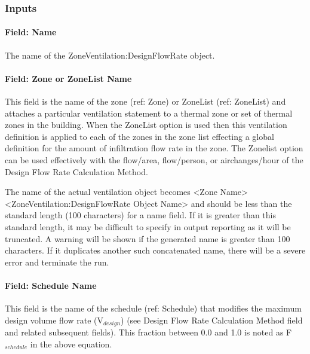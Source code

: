 \subsubsection{Inputs}\label{inputs-2016-06-17-0936}

\paragraph{Field: Name}\label{field-name-2016-06-16}

The name of the ZoneVentilation:DesignFlowRate object.

\paragraph{Field: Zone or ZoneList Name}\label{field-zone-or-zonelist-name-1}

This field is the name of the zone (ref: Zone) or ZoneList (ref: ZoneList) and attaches a particular ventilation statement to a thermal zone or set of thermal zones in the building. When the ZoneList option is used then this ventilation definition is applied to each of the zones in the zone list effecting a global definition for the amount of infiltration flow rate in the zone. The Zonelist option can be used effectively with the flow/area, flow/person, or airchanges/hour of the Design Flow Rate Calculation Method.

The name of the actual ventilation object becomes \textless{}Zone Name\textgreater{} \textless{}ZoneVentilation:DesignFlowRate Object Name\textgreater{} and should be less than the standard length (100 characters) for a name field. If it is greater than this standard length, it may be difficult to specify in output reporting as it will be truncated. A warning will be shown if the generated name is greater than 100 characters. If it duplicates another such concatenated name, there will be a severe error and terminate the run.

\paragraph{Field: Schedule Name}\label{field-schedule-name-2016-06-16}

This field is the name of the schedule (ref: Schedule) that modifies the maximum design volume flow rate (V\(_{design}\)) (see Design Flow Rate Calculation Method field and related subsequent fields). This fraction between 0.0 and 1.0 is noted as F\(_{schedule}\) in the above equation.

